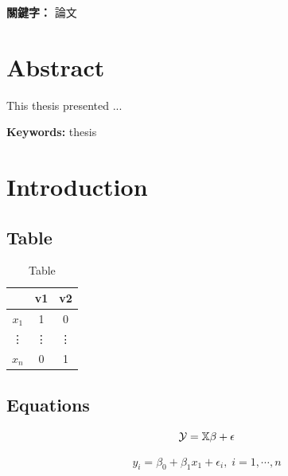 \documentclass[12pt,a4paper,oneside]{book}
\providecommand{\keywordsch}[1]
{
  \small    
  \textbf{關鍵字： }#1
}
\providecommand{\keywords}[1]
{
  \small    
  \textbf{Keywords: }#1
}
\begin{document}
\mbox{}
\vfill
\keywordsch{論文}%

\thispagestyle{empty}

\chapter*{\centering Abstract}

This thesis presented ...

\mbox{}
\vfill
\keywords{thesis}%

\thispagestyle{empty}

\newpage
\setcounter{page}{1}
{
  \hypersetup{linkcolor=black}
  \tableofcontents
}

\newpage

\chapter{Introduction}
\label{ch: intro}
\section{Table}

\begin{table}[H]
\centering
\fontsize{20}{20}\selectfont%
\caption{Table}
\renewcommand{\arraystretch}{1.5}
\label{tab: tab1}
\begin{tabular}[t]{|c|c|c|}%
    \hline
    & v1 & v2 \\
    \hline
    $x_1$ & 1 & 0\\
    \hline
    \vdots & \vdots & \vdots\\
    \hline
    $x_n$ & 0 & 1\\
    \hline
\end{tabular}
\end{table}

\section{Equations}
\begin{equation}\label{equ: reg}
    \Large{\mathcal{Y} = \mathbb{X}\beta+\epsilon}
\end{equation}

\begin{equation*}\label{equ: reg}
    y_i =\beta_0+\beta_1x_1+\epsilon_i,\;i=1,\cdots,n
\end{equation*}
\end{document}
